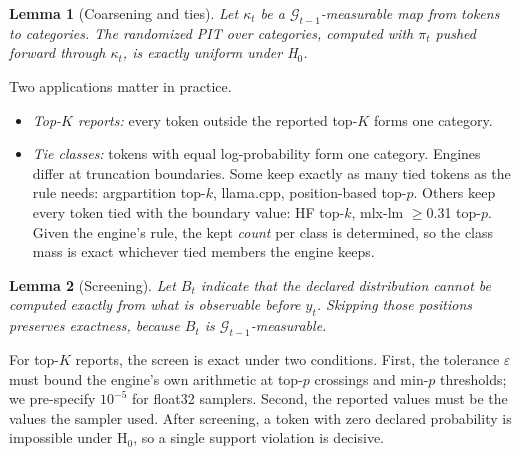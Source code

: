 \documentclass[10pt]{article}
\newtheorem{lemma}{Lemma}
\theoremstyle{remark}
\begin{document}
\begin{lemma}[Coarsening and ties]\label{lem:ties}
Let $\kappa_t$ be a $\mathcal G_{t-1}$-measurable map from tokens to categories. The randomized PIT over categories, computed with $\pi_t$ pushed forward through $\kappa_t$, is exactly uniform under H$_0$.
\end{lemma}
\noindent Two applications matter in practice.
\begin{itemize}
\item \emph{Top-$K$ reports:} every token outside the reported top-$K$ forms one category.
\item \emph{Tie classes:} tokens with equal log-probability form one category. Engines differ at truncation boundaries. Some keep exactly as many tied tokens as the rule needs: argpartition top-$k$, llama.cpp, position-based top-$p$. Others keep every token tied with the boundary value: HF top-$k$, mlx-lm $\ge$0.31 top-$p$. Given the engine's rule, the kept \emph{count} per class is determined, so the class mass is exact whichever tied members the engine keeps.
\end{itemize}

\begin{lemma}[Screening]\label{lem:screen}
Let $B_t$ indicate that the declared distribution cannot be computed exactly from what is observable before $y_t$. Skipping those positions preserves exactness, because $B_t$ is $\mathcal G_{t-1}$-measurable.
\end{lemma}
\noindent For top-$K$ reports, the screen is exact under two conditions. First, the tolerance $\varepsilon$ must bound the engine's own arithmetic at top-$p$ crossings and min-$p$ thresholds; we pre-specify $10^{-5}$ for float32 samplers. Second, the reported values must be the values the sampler used. After screening, a token with zero declared probability is impossible under H$_0$, so a single support violation is decisive.
\end{document}
